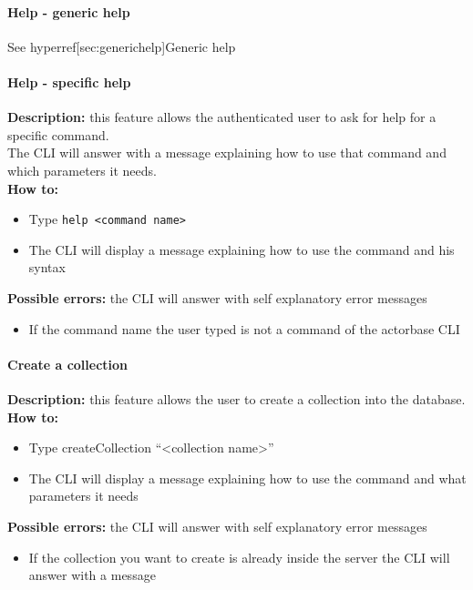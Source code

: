 \documentclass{scalatekids-article}
\begin{document}
\paragraph{Help - generic help}

See hyperref[sec:generichelp]{Generic help}

\paragraph{Help - specific help}
\label{sec:specifichelp}
\textbf{Description:} this feature allows the authenticated user to ask for help for 
a specific command.\\
The CLI will answer with a message explaining how to use that command and 
which parameters it needs.\\
\textbf{How to:} 
\begin{itemize}
	\item Type \texttt{help <command name>}
	\item The CLI will display a message explaining how to use the command and his syntax
\end{itemize}
\textbf{Possible errors:} the CLI will answer with self explanatory error messages 
\begin{itemize}
	\item If the command name the user typed is not a command of the actorbase CLI
\end{itemize}

\paragraph{Create a collection}
\label{sec:createcollection}
\textbf{Description:} this feature allows the user to create a 
collection into the database.\\
\textbf{How to:} 
\begin{itemize}
	\item Type createCollection ``<collection name>''
	\item The CLI will display a message explaining how to use the command and what parameters it needs
\end{itemize}
\textbf{Possible errors:} the CLI will answer with self explanatory error messages 
\begin{itemize}
	\item If the collection you want to create is already inside the server the CLI will answer with a message
\end{itemize}
\end{document}
